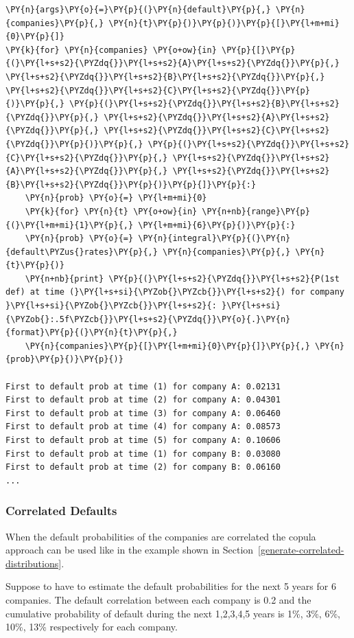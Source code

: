 \begin{tcolorbox}[breakable, size=fbox, boxrule=1pt, pad at break*=1mm,colback=cellbackground, colframe=cellborder]
\begin{Verbatim}[commandchars=\\\{\}]
\PY{n}{args}\PY{o}{=}\PY{p}{(}\PY{n}{default}\PY{p}{,} \PY{n}{companies}\PY{p}{,} \PY{n}{t}\PY{p}{)}\PY{p}{)}\PY{p}{[}\PY{l+m+mi}{0}\PY{p}{]}
\PY{k}{for} \PY{n}{companies} \PY{o+ow}{in} \PY{p}{[}\PY{p}{(}\PY{l+s+s2}{\PYZdq{}}\PY{l+s+s2}{A}\PY{l+s+s2}{\PYZdq{}}\PY{p}{,} \PY{l+s+s2}{\PYZdq{}}\PY{l+s+s2}{B}\PY{l+s+s2}{\PYZdq{}}\PY{p}{,} \PY{l+s+s2}{\PYZdq{}}\PY{l+s+s2}{C}\PY{l+s+s2}{\PYZdq{}}\PY{p}{)}\PY{p}{,} \PY{p}{(}\PY{l+s+s2}{\PYZdq{}}\PY{l+s+s2}{B}\PY{l+s+s2}{\PYZdq{}}\PY{p}{,} \PY{l+s+s2}{\PYZdq{}}\PY{l+s+s2}{A}\PY{l+s+s2}{\PYZdq{}}\PY{p}{,} \PY{l+s+s2}{\PYZdq{}}\PY{l+s+s2}{C}\PY{l+s+s2}{\PYZdq{}}\PY{p}{)}\PY{p}{,} \PY{p}{(}\PY{l+s+s2}{\PYZdq{}}\PY{l+s+s2}{C}\PY{l+s+s2}{\PYZdq{}}\PY{p}{,} \PY{l+s+s2}{\PYZdq{}}\PY{l+s+s2}{A}\PY{l+s+s2}{\PYZdq{}}\PY{p}{,} \PY{l+s+s2}{\PYZdq{}}\PY{l+s+s2}{B}\PY{l+s+s2}{\PYZdq{}}\PY{p}{)}\PY{p}{]}\PY{p}{:}
    \PY{n}{prob} \PY{o}{=} \PY{l+m+mi}{0}
    \PY{k}{for} \PY{n}{t} \PY{o+ow}{in} \PY{n+nb}{range}\PY{p}{(}\PY{l+m+mi}{1}\PY{p}{,} \PY{l+m+mi}{6}\PY{p}{)}\PY{p}{:}
    \PY{n}{prob} \PY{o}{=} \PY{n}{integral}\PY{p}{(}\PY{n}{default\PYZus{}rates}\PY{p}{,} \PY{n}{companies}\PY{p}{,} \PY{n}{t}\PY{p}{)}
    \PY{n+nb}{print} \PY{p}{(}\PY{l+s+s2}{\PYZdq{}}\PY{l+s+s2}{P(1st def) at time (}\PY{l+s+si}{\PYZob{}\PYZcb{}}\PY{l+s+s2}{) for company }\PY{l+s+si}{\PYZob{}\PYZcb{}}\PY{l+s+s2}{: }\PY{l+s+si}{\PYZob{}:.5f\PYZcb{}}\PY{l+s+s2}{\PYZdq{}}\PY{o}{.}\PY{n}{format}\PY{p}{(}\PY{n}{t}\PY{p}{,} 
    \PY{n}{companies}\PY{p}{[}\PY{l+m+mi}{0}\PY{p}{]}\PY{p}{,} \PY{n}{prob}\PY{p}{)}\PY{p}{)}

First to default prob at time (1) for company A: 0.02131
First to default prob at time (2) for company A: 0.04301
First to default prob at time (3) for company A: 0.06460
First to default prob at time (4) for company A: 0.08573
First to default prob at time (5) for company A: 0.10606
First to default prob at time (1) for company B: 0.03080
First to default prob at time (2) for company B: 0.06160
...
\end{Verbatim}
\end{tcolorbox}

\subsubsection{Correlated Defaults}\label{correlated-defaults}
When the default probabilities of the companies are correlated the copula approach can be used like in the example shown in Section~\ref{generate-correlated-distributions}.

Suppose to have to estimate the default probabilities for the next 5 years for 6 companies. 
The default correlation between each company is 0.2 and the cumulative probability of default during the next 1,2,3,4,5 years is 1\%, 3\%, 6\%, 10\%, 13\% respectively for each company.

